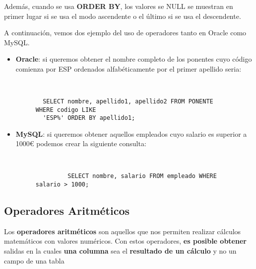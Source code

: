 Además, cuando se usa \textbf{ORDER BY}, los valores se NULL se muestran en primer lugar si se usa el modo ascendente o el último si se usa el descendente.

A continuación, vemos dos ejemplo del uso de operadores tanto en Oracle como MySQL.

\begin{itemize}
    \item \textbf{Oracle}: si queremos obtener el nombre completo de los ponentes cuyo código comienza por ESP ordenados alfabéticamente por el primer apellido seria:

    \begin{figure}[h]
        \begin{tcolorbox}[sharp corners, colback=yellow!30, colframe=white!20]
            \scriptsize
            \begin{verbatim}


  SELECT nombre, apellido1, apellido2 FROM PONENTE WHERE codigo LIKE
  'ESP%' ORDER BY apellido1;
            \end{verbatim}
        \end{tcolorbox}
    \end{figure}

    \item \textbf{MySQL}: si queremos obtener aquellos empleados cuyo salario es superior a 1000€ podemos crear la siguiente consulta:

    \begin{figure}[H]
        \begin{tcolorbox}[sharp corners, colback=yellow!30, colframe=white!20]
            \scriptsize
            \begin{verbatim}


         SELECT nombre, salario FROM empleado WHERE salario > 1000;
            \end{verbatim}
        \end{tcolorbox}
    \end{figure}
\end{itemize}

\subsection{Operadores Aritméticos}
Los \textbf{operadores aritméticos} son aquellos que nos permiten realizar cálculos matemáticos con valores numéricos. Con estos operadores, \textbf{es posible obtener} salidas en la cuales \textbf{una columna} sea el \textbf{resultado de un cálculo} y no un campo de una tabla

